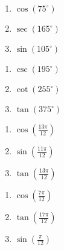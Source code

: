 \begin{multicols}{3}

\begin{enumerate}

\setcounter{enumi}{\value{HW}}

\item  \label{cos75} $\cos(75^{\circ})$ \label{sumdifffirst} 
\item  $\sec(165^{\circ})$
\item  \label{sin105} $\sin(105^{\circ})$

\setcounter{HW}{\value{enumi}}

\end{enumerate}

\end{multicols}

\begin{multicols}{3}

\begin{enumerate}

\setcounter{enumi}{\value{HW}}

\item  $\csc(195^{\circ})$
\item  $\cot(255^{\circ})$
\item  $\tan(375^{\circ})$

\setcounter{HW}{\value{enumi}}

\end{enumerate}

\end{multicols}

\begin{multicols}{3}

\begin{enumerate}

\setcounter{enumi}{\value{HW}}

\item  $\cos\left(\frac{13\pi}{12}\right)$
\item  $\sin\left(\frac{11\pi}{12}\right)$
\item  $\tan\left(\frac{13\pi}{12}\right)$

\setcounter{HW}{\value{enumi}}

\end{enumerate}

\end{multicols}

\begin{multicols}{3}

\begin{enumerate}

\setcounter{enumi}{\value{HW}}

\item \label{cos7pi12} $\cos \left( \frac{7\pi}{12} \right)$
\item $\tan \left( \frac{17\pi}{12} \right)$
\item \label{sinpi12} $\sin \left( \frac{\pi}{12} \right)$ 

\setcounter{HW}{\value{enumi}}

\end{enumerate}

\end{multicols}

